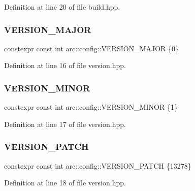 Definition at line 20 of file build.\+hpp.

\mbox{\label{namespacearc_1_1config_a6b833939cb69b12a34746425eb3fd6cc}} 
\subsubsection{\texorpdfstring{VERSION\_MAJOR}{VERSION\_MAJOR}}
{\footnotesize\ttfamily constexpr const int arc\+::config\+::\+V\+E\+R\+S\+I\+O\+N\+\_\+\+M\+A\+J\+OR \{0\}}



Definition at line 16 of file version.\+hpp.

\mbox{\label{namespacearc_1_1config_a5518e18fcfc6399d19e9f67464964320}} 
\subsubsection{\texorpdfstring{VERSION\_MINOR}{VERSION\_MINOR}}
{\footnotesize\ttfamily constexpr const int arc\+::config\+::\+V\+E\+R\+S\+I\+O\+N\+\_\+\+M\+I\+N\+OR \{1\}}



Definition at line 17 of file version.\+hpp.

\mbox{\label{namespacearc_1_1config_aef9d6e2bb18cb78ca941ab4483c5e6f3}} 
\subsubsection{\texorpdfstring{VERSION\_PATCH}{VERSION\_PATCH}}
{\footnotesize\ttfamily constexpr const int arc\+::config\+::\+V\+E\+R\+S\+I\+O\+N\+\_\+\+P\+A\+T\+CH \{13278\}}



Definition at line 18 of file version.\+hpp.

